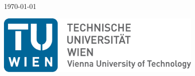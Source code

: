 \begin{titlepage}


{\large \today}\\[1.5cm] %

\vfill

\includegraphics[width=0.75\textwidth]{figures/uni_titlepage}\\[5cm] %
 

\vfill %

\end{titlepage}